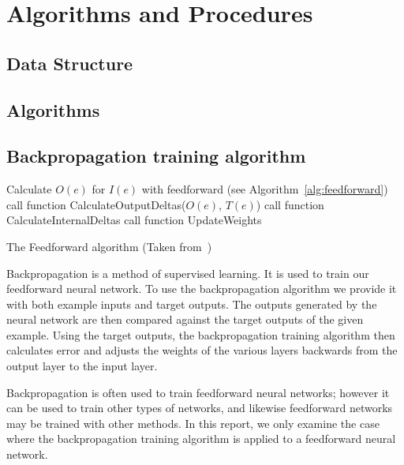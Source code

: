 \documentclass[11pt]{article}
\begin{document}


\section{Algorithms and Procedures} %
\label{sec:algorithms_and_procedures}

\subsection{Data Structure} %
\label{sub:data_structure}


\subsection{Algorithms} %
\label{sub:algorithms}

\subsection{Backpropagation training algorithm} %
\label{sub:backpropagation_training_algorithm}

\begin{algorithm}%
\SetLine
{}
{
	Calculate $O(e)$ for $I(e)$ with feedforward (see Algorithm~\ref{alg:feedforward})\;
	call function CalculateOutputDeltas($O(e)$, $T(e)$)\;
	call function CalculateInternalDeltas\;
	call function UpdateWeights\;
}

\caption{The Feedforward algorithm (Taken from~\cite{skapura})}
\label{alg:feedforward}
\end{algorithm}

Backpropagation is a method of supervised learning. It is used to train our feedforward neural network. To use the backpropagation
algorithm we provide it with both example inputs and target outputs. The outputs generated by the neural network are then compared
against the target outputs of the given example. Using the target outputs, the backpropagation training algorithm then calculates error
and adjusts the weights of the various layers backwards from the output layer to the input layer.

Backpropagation is often used to train feedforward neural networks; however it can be used to train other types of networks, and
likewise feedforward networks may be trained with other methods. In this report, we only examine the case where the backpropagation
training algorithm is applied to a feedforward neural network.
\end{document}
